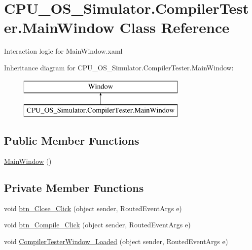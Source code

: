 \hypertarget{class_c_p_u___o_s___simulator_1_1_compiler_tester_1_1_main_window}{}\section{C\+P\+U\+\_\+\+O\+S\+\_\+\+Simulator.\+Compiler\+Tester.\+Main\+Window Class Reference}
\label{class_c_p_u___o_s___simulator_1_1_compiler_tester_1_1_main_window}


Interaction logic for Main\+Window.\+xaml  


Inheritance diagram for C\+P\+U\+\_\+\+O\+S\+\_\+\+Simulator.\+Compiler\+Tester.\+Main\+Window\+:\begin{figure}[H]
\begin{center}
\leavevmode
\includegraphics[height=2.000000cm]{class_c_p_u___o_s___simulator_1_1_compiler_tester_1_1_main_window}
\end{center}
\end{figure}
\subsection*{Public Member Functions}
\begin{DoxyCompactItemize}
\item 
\hyperlink{class_c_p_u___o_s___simulator_1_1_compiler_tester_1_1_main_window_a067de72c2192f57acab21aec73dd8074}{Main\+Window} ()
\end{DoxyCompactItemize}
\subsection*{Private Member Functions}
\begin{DoxyCompactItemize}
\item 
void \hyperlink{class_c_p_u___o_s___simulator_1_1_compiler_tester_1_1_main_window_a8230f868ae44ef7a5099ac14607e330c}{btn\+\_\+\+Close\+\_\+\+Click} (object sender, Routed\+Event\+Args e)
\item 
void \hyperlink{class_c_p_u___o_s___simulator_1_1_compiler_tester_1_1_main_window_af755f7ae0752d06a31b1c30e51a05513}{btn\+\_\+\+Compile\+\_\+\+Click} (object sender, Routed\+Event\+Args e)
\item 
void \hyperlink{class_c_p_u___o_s___simulator_1_1_compiler_tester_1_1_main_window_a9c99afbfd4e46cc2d5f5c6fd499ff3b0}{Compiler\+Tester\+Window\+\_\+\+Loaded} (object sender, Routed\+Event\+Args e)
\end{DoxyCompactItemize}
